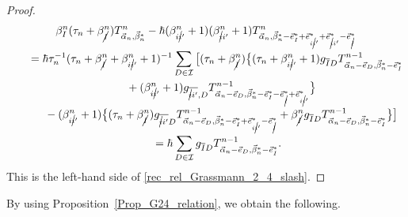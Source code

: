 \documentclass[pdftex]{sigma}
\numberwithin{equation}{section}
\begin{document}
\begin{proof}
\begin{gather*}
 \beta_{I}^{n}
 (
 \tau_{n}
 +
 \beta_{\cancel{I}}^{n}
 )
 T^{n}_{\vec{\alpha}_{n},\vec{\beta}_{n}^{\ast}}
 -
 \hbar
 (
 \beta_{i\cancel{i}'}^{n}
 +
 1
 )
 (
 \beta_{\cancel{i}i'}^{n}
 +
 1
 )
 T^{n}_{\vec{\alpha}_{n},\vec{\beta}_{n}^{\ast}-\vec{e}_{I}^{\ast}
 +\vec{e}_{i\cancel{i}'}^{\ast}+\vec{e}_{\cancel{i}i'}^{\ast}-\vec{e}_{\cancel{I}}^{\ast}}
 \\
 \qquad=
 \hbar
 \tau_{n}^{-1}
 (
 \tau_{n}
 +
 \beta_{\cancel{I}}^{n}
 +
 \beta_{i\cancel{i}'}^{n}
 +
 1
 )^{-1} \sum_{
 D
 \in
 \mathcal{I}
 }
 \big[
 (
 \tau_{n}
 +
 \beta_{\cancel{I}}^{n}
 )
 \bigl\{
 (
 \tau_{n}
 +
 \beta_{i\cancel{i}'}^{n}
 +
 1
 )
 g_{\overline{I}D}
 T^{n-1}_{
 \vec{\alpha}_{n}
 -
 \vec{e}_{D},
 \vec{\beta}_{n}^{\ast}
 -
 \vec{e}_{I}^{\ast}
 }
 \\
\phantom{\qquad=}{}
 +
 (
 \beta_{i\cancel{i}'}^{n}
 +
 1
 )
 g_{\overline{\cancel{i}i'},D}
 T^{n-1}_{
 \vec{\alpha}_{n}
 -
 \vec{e}_{D},
 \vec{\beta}_{n}^{\ast}
 -
 \vec{e}_{I}^{\ast}
 -
 \vec{e}_{\cancel{I}}^{\ast}
 +
 \vec{e}_{i\cancel{i}'}^{\ast}
 }
 \bigr\}
 \\
\phantom{\qquad=}{}
 -
 (
 \beta_{i\cancel{i}'}^{n}
 +
 1
 )
 \bigl\{
 (
 \tau_{n}
 +
 \beta_{\cancel{I}}^{n}
 )
 g_{\overline{\cancel{i}i'}D}
 T^{n-1}_{
 \vec{\alpha}_{n}
 -
 \vec{e}_{D},
 \vec{\beta}_{n}^{\ast}
 -
 \vec{e}_{I}^{\ast}
 +
 \vec{e}_{i\cancel{i}'}^{\ast}
 -
 \vec{e}_{\cancel{I}}^{\ast}
 }
 +
 \beta_{\cancel{I}}^{n}
 g_{\overline{I}D}
 T^{n-1}_{
 \vec{\alpha}_{n}
 -
 \vec{e}_{D},
 \vec{\beta}_{n}^{\ast}
 -
 \vec{e}_{I}^{\ast}
 }
 \bigr\}
 \big]
 \\
\phantom{\qquad}{}=
 \hbar
 \sum_{
 D
 \in
 \mathcal{I}
 }
 g_{\overline{I}D}
 T^{n-1}_{
 \vec{\alpha}_{n}
 -
 \vec{e}_{D},
 \vec{\beta}_{n}^{\ast}
 -
 \vec{e}_{I}^{\ast}
 }.
\end{gather*}
This is the left-hand side of \eqref{rec_rel_Grassmann_2_4_slash}.
\end{proof}

By using Proposition~\ref{Prop_G24_relation}, we obtain the following.
\end{document}
